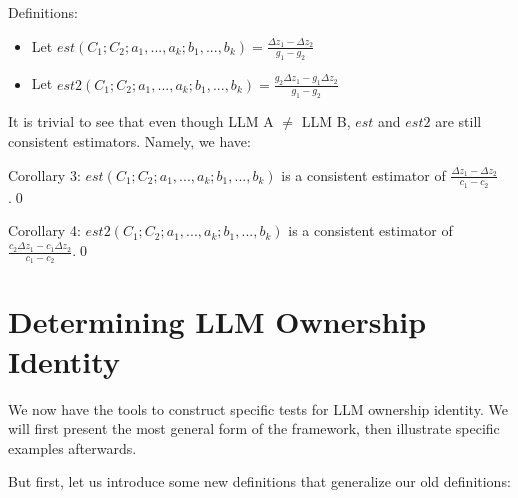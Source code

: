 \documentclass{article}
\begin{document}
Definitions:
\begin{itemize}
\item Let $\displaystyle est\left( C_{1} ;C_{2} ;a_{1} ,...,a_{k} ;b_{1} ,...,b_{k}\right) =\frac{\Delta z_{1} -\Delta z_{2}}{g_{1} -g_{2}}$
\item Let $\displaystyle est2\left( C_{1} ;C_{2} ;a_{1} ,...,a_{k} ;b_{1} ,...,b_{k}\right) =\frac{g_{2} \Delta z_{1} -g_{1} \Delta z_{2}}{g_{1} -g_{2}}$
\end{itemize}

It is trivial to see that even though LLM A $\displaystyle \neq $ LLM B, $\displaystyle est$ and $\displaystyle est2$ are still consistent estimators. Namely, we have:



Corollary 3: $\displaystyle est\left( C_{1} ;C_{2} ;a_{1} ,...,a_{k} ;b_{1} ,...,b_{k}\right)$ is a consistent estimator of $\displaystyle \frac{\Delta z_{1} -\Delta z_{2}}{c_{1} -c_{2}}$.\qed 



Corollary 4: $\displaystyle est2\left( C_{1} ;C_{2} ;a_{1} ,...,a_{k} ;b_{1} ,...,b_{k}\right)$ is a consistent estimator of $\displaystyle \frac{c_{2} \Delta z_{1} -c_{1} \Delta z_{2}}{c_{1} -c_{2}}$.\qed 



\section{Determining LLM Ownership Identity}

We now have the tools to construct specific tests for LLM ownership identity. We will first present the most general form of the framework, then illustrate specific examples afterwards.



But first, let us introduce some new definitions that generalize our old definitions:
\end{document}

